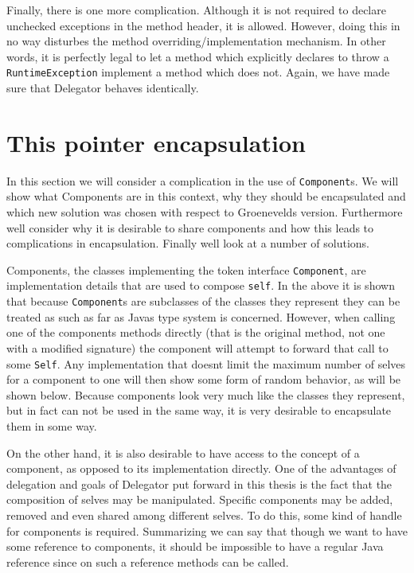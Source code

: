 \documentclass[a4paper,12pt]{book}
\begin{document}
Finally, there is one more complication. Although it is not required to declare unchecked exceptions in the method header, it is allowed. However, doing this in no way disturbes the method overriding/implementation mechanism. In other words, it is perfectly legal to let a method which explicitly declares to throw a \verb|RuntimeException| implement a method which does not. Again, we have made sure that Delegator behaves identically.

\chapter{This pointer encapsulation}
In this section we will consider a complication in the use of \verb|Component|s. We will show what Components are in this context, why they should be encapsulated and which new solution was chosen with respect to Groenevelds version. Furthermore well consider why it is desirable to share components and how this leads to complications in encapsulation. Finally well look at a number of solutions.

Components, the classes implementing the token interface \verb|Component|, are implementation details that are used to compose \verb|self|. In the above it is shown that because \verb|Component|s are subclasses of the classes they represent they can be treated as such as far as Javas type system is concerned. However, when calling one of the components methods directly (that is the original method, not one with a modified signature) the component will attempt to forward that call to some \verb|Self|. Any implementation that doesnt limit the maximum number of selves for a component to one will then show some form of random behavior, as will be shown below. Because components look very much like the classes they represent, but in fact can not be used in the same way, it is very desirable to encapsulate them in some way.

On the other hand, it is also desirable to have access to the concept of a component, as opposed to its implementation directly. One of the advantages of delegation and goals of Delegator put forward in this thesis is the fact that the composition of selves may be manipulated. Specific components may be added, removed and even shared among different selves. To do this, some kind of handle for components is required. Summarizing we can say that though we want to have some reference to components, it should be impossible to have a regular Java reference since on such a reference methods can be called.
\end{document}
